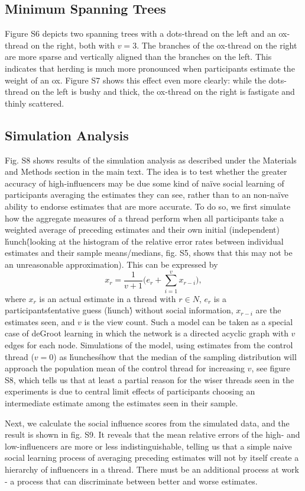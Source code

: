 \documentclass[9pt,twoside,lineno]{pnas-new}
\begin{document}
\subsection*{Minimum Spanning Trees}
Figure S6 depicts two spanning trees with a dots-thread on the left and an ox-thread on the right, both with $v=3$. The branches of the ox-thread on the right are more sparse and vertically aligned than the branches on the left. This indicates that herding is much more pronounced when participants estimate the weight of an ox. Figure S7 shows this effect even more clearly: while the dots-thread on the left is bushy and thick, the ox-thread on the right is fastigate and thinly scattered. 

\subsection*{Simulation Analysis}
Fig. S8 shows results of the simulation analysis as described under the Materials and Methods section in the main text. The idea is to test whether the greater accuracy of high-influencers may be due some kind of naïve social learning of participants averaging the estimates they can see, rather than to an non-naïve ability to endorse estimates that are more accurate. To do so, we first simulate how the aggregate measures of a thread perform when all participants take a weighted average of preceding estimates and their own initial (independent) \'hunch\' (looking at the histogram of the relative error rates between individual estimates and their sample means/medians, fig. S5, shows that this may not be an unreasonable approximation). This can be expressed by $$x_r = \frac{1}{v+1} \Big(e_r + \sum_{i=1}^{v} x_{r-i}\Big),$$ where $x_r$ is an actual estimate in a thread with $r \in N$, $e_r$ is a participants\' tentative guess (\'hunch\') without social information, $x_{r-i}$ are the estimates seen, and $v$ is the view count. Such a model can be taken as a special case of deGroot learning in which the network is a directed acyclic graph with $v$ edges for each node. Simulations of the model, using estimates from the control thread ($v=0$) as \'hunches\' show that the median of the sampling distribution will approach the population mean of the control thread for increasing $v$, see figure S8, which tells us that at least a partial reason for the wiser threads seen in the experiments is due to central limit effects of participants choosing an intermediate estimate among the estimates seen in their sample. 

Next, we calculate the social influence scores from the simulated data, and the result is shown in fig. S9. It reveals that the mean relative errors of the high- and low-influencers are more or less indistinguishable, telling us that a simple naive social learning process of averaging preceding estimates will not by itself create a hierarchy of influencers in a thread. There must be an additional process at work - a process that can discriminate between better and worse estimates.  
\end{document}
